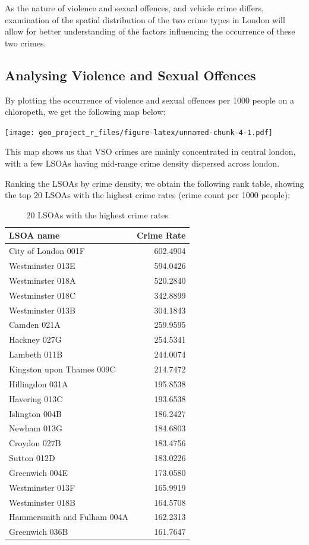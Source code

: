 \documentclass[]{article}
\theoremstyle{definition}
\theoremstyle{definition}
\theoremstyle{definition}
\theoremstyle{remark}
\begin{document}
As the nature of violence and sexual offences, and vehicle crime
differs, examination of the spatial distribution of the two crime types
in London will allow for better understanding of the factors influencing
the occurrence of these two crimes.

\subsection{Analysing Violence and Sexual
Offences}\label{analysing-violence-and-sexual-offences}

By plotting the occurrence of violence and sexual offences per 1000
people on a chloropeth, we get the following map below:

\texttt{[image: geo\_project\_r\_files/figure-latex/unnamed-chunk-4-1.pdf]}

This map shows us that VSO crimes are mainly concentrated in central
london, with a few LSOAs having mid-range crime density dispersed across
london.

Ranking the LSOAs by crime density, we obtain the following rank table,
showing the top 20 LSOAs with the highest crime rates (crime count per
1000 people):

\begin{table}

\caption{\label{tab:top20}20 LSOAs with the highest crime rates}
\centering
\begin{tabular}[t]{l|r}
\hline
LSOA name & Crime Rate\\
\hline
City of London 001F & 602.4904\\
\hline
Westminster 013E & 594.0426\\
\hline
Westminster 018A & 520.2840\\
\hline
Westminster 018C & 342.8899\\
\hline
Westminster 013B & 304.1843\\
\hline
Camden 021A & 259.9595\\
\hline
Hackney 027G & 254.5341\\
\hline
Lambeth 011B & 244.0074\\
\hline
Kingston upon Thames 009C & 214.7472\\
\hline
Hillingdon 031A & 195.8538\\
\hline
Havering 013C & 193.6538\\
\hline
Islington 004B & 186.2427\\
\hline
Newham 013G & 184.6803\\
\hline
Croydon 027B & 183.4756\\
\hline
Sutton 012D & 183.0226\\
\hline
Greenwich 004E & 173.0580\\
\hline
Westminster 013F & 165.9919\\
\hline
Westminster 018B & 164.5708\\
\hline
Hammersmith and Fulham 004A & 162.2313\\
\hline
Greenwich 036B & 161.7647\\
\hline
\end{tabular}
\end{table}
\end{document}
